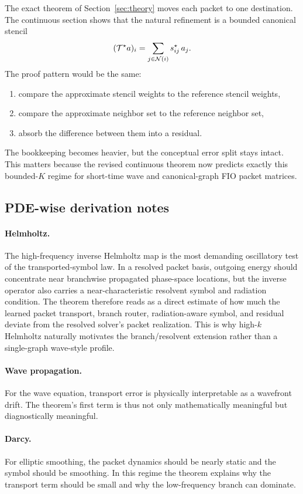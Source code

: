The exact theorem of Section~\ref{sec:theory} moves each packet to one destination. The continuous section shows that the natural refinement is a bounded canonical stencil
\[
(\mathcal T^\star a)_i = \sum_{j\in \mathcal N(i)} s^\star_{ij}\, a_j.
\]
The proof pattern would be the same:
\begin{enumerate}
\item compare the approximate stencil weights to the reference stencil weights,
\item compare the approximate neighbor set to the reference neighbor set,
\item absorb the difference between them into a residual.
\end{enumerate}
The bookkeeping becomes heavier, but the conceptual error split stays intact. This matters because the revised continuous theorem now predicts exactly this bounded-$K$ regime for short-time wave and canonical-graph FIO packet matrices.

\subsection{PDE-wise derivation notes}

\paragraph{Helmholtz.}
The high-frequency inverse Helmholtz map is the most demanding oscillatory test of the transported-symbol law. In a resolved packet basis, outgoing energy should concentrate near branchwise propagated phase-space locations, but the inverse operator also carries a near-characteristic resolvent symbol and radiation condition. The theorem therefore reads as a direct estimate of how much the learned packet transport, branch router, radiation-aware symbol, and residual deviate from the resolved solver's packet realization. This is why high-$k$ Helmholtz naturally motivates the branch/resolvent extension rather than a single-graph wave-style profile.

\paragraph{Wave propagation.}
For the wave equation, transport error is physically interpretable as a wavefront drift. The theorem's first term is thus not only mathematically meaningful but diagnostically meaningful.

\paragraph{Darcy.}
For elliptic smoothing, the packet dynamics should be nearly static and the symbol should be smoothing. In this regime the theorem explains why the transport term should be small and why the low-frequency branch can dominate.

